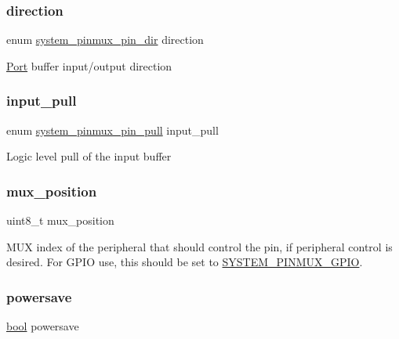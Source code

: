 \subsubsection{\texorpdfstring{direction}{direction}}
{\footnotesize\ttfamily enum \mbox{\hyperlink{group__asfdoc__sam0__system__pinmux__group_gaef5ed797ec6ce6e7f2ca4bafd3f77df2}{system\+\_\+pinmux\+\_\+pin\+\_\+dir}} direction}

\mbox{\hyperlink{struct_port}{Port}} buffer input/output direction \mbox{\label{structsystem__pinmux__config_a0cd4d1807014bbdb629546ddd3a087e5}} 
\subsubsection{\texorpdfstring{input\_pull}{input\_pull}}
{\footnotesize\ttfamily enum \mbox{\hyperlink{group__asfdoc__sam0__system__pinmux__group_ga936e823e4b08dc981d39c273182eb1c6}{system\+\_\+pinmux\+\_\+pin\+\_\+pull}} input\+\_\+pull}

Logic level pull of the input buffer \mbox{\label{structsystem__pinmux__config_aa9646c2ccc3560b908c071d79f304ef1}} 
\subsubsection{\texorpdfstring{mux\_position}{mux\_position}}
{\footnotesize\ttfamily uint8\+\_\+t mux\+\_\+position}

M\+UX index of the peripheral that should control the pin, if peripheral control is desired. For G\+P\+IO use, this should be set to \mbox{\hyperlink{group__asfdoc__sam0__system__pinmux__group_gaf212e7bc2a29cb57ab7b1130e4404a6b}{S\+Y\+S\+T\+E\+M\+\_\+\+P\+I\+N\+M\+U\+X\+\_\+\+G\+P\+IO}}. \mbox{\label{structsystem__pinmux__config_afbc3e052896051a278a5ad17f6a6e2bb}} 
\subsubsection{\texorpdfstring{powersave}{powersave}}
{\footnotesize\ttfamily \mbox{\hyperlink{group__group__sam0__utils_ga97a80ca1602ebf2303258971a2c938e2}{bool}} powersave}


